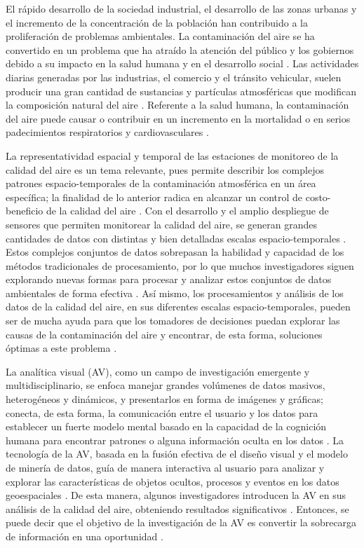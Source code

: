 El rápido desarrollo de la sociedad industrial, el desarrollo de las zonas urbanas y el incremento de la concentración de la población han contribuido a la proliferación de problemas ambientales. La contaminación del aire se ha convertido en un problema que ha atraído la atención del público y los gobiernos debido a su impacto en la salud humana y en el desarrollo social \citep{Zhou2017, INECC2017, Deng2020}. Las actividades diarias generadas por las industrias, el comercio y el tránsito vehicular, suelen producir una gran cantidad de sustancias y partículas atmosféricas que modifican la composición natural del aire \citep{Engel2012, INECC2017}. Referente a la salud humana, la contaminación del aire puede causar o contribuir en un incremento en la mortalidad o en serios padecimientos respiratorios y cardiovasculares \citep{Kampa2008, Mathioudakis2020}. 

La representatividad espacial y temporal de las estaciones de monitoreo de la calidad del aire es un tema relevante, pues permite describir los complejos patrones espacio-temporales de la contaminación atmosférica en un área específica; la finalidad de lo anterior radica en alcanzar un control de costo-beneficio de la calidad del aire \citep{Righini2014}. Con el desarrollo y el amplio despliegue de sensores que permiten monitorear la calidad del aire, se generan grandes cantidades de datos con distintas y bien detalladas escalas espacio-temporales \citep{Liao2014, Zhou2017}. Estos complejos conjuntos de datos sobrepasan la habilidad y capacidad de los métodos tradicionales de procesamiento, por lo que muchos investigadores siguen explorando nuevas formas para procesar y analizar estos conjuntos de datos ambientales de forma efectiva \citep{Liao2014}. Así mismo, los procesamientos y análisis de los datos de la calidad del aire, en sus diferentes escalas espacio-temporales, pueden ser de mucha ayuda para que los tomadores de decisiones puedan explorar las causas de la contaminación del aire y encontrar, de esta forma, soluciones óptimas a este problema \citep{Zhou2017}.

La analítica visual (AV), como un campo de investigación emergente y multidisciplinario, se enfoca manejar grandes volúmenes de datos masivos, heterogéneos y dinámicos, y presentarlos en forma de imágenes y gráficas; conecta, de esta forma, la comunicación entre el usuario y los datos para establecer un fuerte modelo mental basado en la capacidad de la cognición humana para encontrar patrones o alguna información oculta en los datos \citep{Liao2014, Keim2006}. La tecnología de la AV, basada en la fusión efectiva de el diseño visual y el modelo de minería de datos, guía de manera interactiva al usuario para analizar y explorar las características de objetos ocultos, procesos y eventos en los datos geoespaciales \citep{Zhou2018}. De esta manera, algunos investigadores introducen la AV en sus análisis de la calidad del aire, obteniendo resultados significativos \citep{Liao2014}. Entonces, se puede decir que el objetivo de la investigación de la AV es convertir la sobrecarga de información en una oportunidad \citep{Keim2006}.
